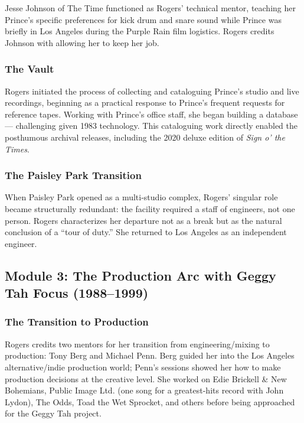 \documentclass[11pt,letterpaper]{article}
\begin{document}
Jesse Johnson of The Time functioned as Rogers' technical mentor, teaching her Prince's specific preferences for kick drum and snare sound while Prince was briefly in Los Angeles during the Purple Rain film logistics. Rogers credits Johnson with allowing her to keep her job.

\subsubsection{The Vault}

Rogers initiated the process of collecting and cataloguing Prince's studio and live recordings, beginning as a practical response to Prince's frequent requests for reference tapes. Working with Prince's office staff, she began building a database --- challenging given 1983 technology. This cataloguing work directly enabled the posthumous archival releases, including the 2020 deluxe edition of \textit{Sign o' the Times}.

\subsubsection{The Paisley Park Transition}

When Paisley Park opened as a multi-studio complex, Rogers' singular role became structurally redundant: the facility required a staff of engineers, not one person. Rogers characterizes her departure not as a break but as the natural conclusion of a ``tour of duty.'' She returned to Los Angeles as an independent engineer.

\subsection{Module 3: The Production Arc with Geggy Tah Focus (1988--1999)}

\subsubsection{The Transition to Production}

Rogers credits two mentors for her transition from engineering/mixing to production: Tony Berg and Michael Penn. Berg guided her into the Los Angeles alternative/indie production world; Penn's sessions showed her how to make production decisions at the creative level. She worked on Edie Brickell \& New Bohemians, Public Image Ltd. (one song for a greatest-hits record with John Lydon), The Odds, Toad the Wet Sprocket, and others before being approached for the Geggy Tah project.
\end{document}
